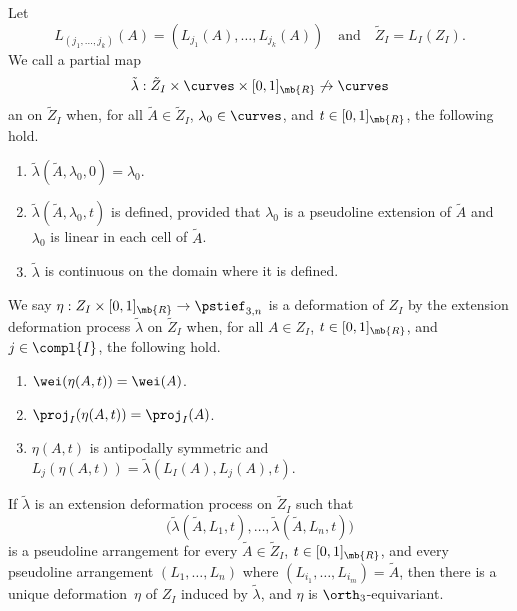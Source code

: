 Let
\[
L_{(j_1,\dots,j_k)}(A) = (L_{j_1}(A),\dots,L_{j_k}(A))
\quad \text{and} \quad
\tilde Z_I = L_I(Z_I).
\]
We call a partial map
\[ \tilde \lambda : \tilde Z_I \times \curves \times [0,1]_\mb{R} \not\to \curves \]
an  on $\tilde Z_I$ when, for all $\tilde A \in \tilde Z_I$, $\lambda_0 \in \curves$, and $t \in [0,1]_\mb{R}$, the following hold.
\begin{enumerate}
\item
$\tilde \lambda(\tilde A, \lambda_0, 0) = \lambda_0$.
\item
$\tilde \lambda(\tilde A, \lambda_0, t)$ is defined,
provided that $\lambda_0$ is a pseudoline extension of $\tilde A$ and $\lambda_0$ is linear in each cell of $\tilde A$.
\item
$\tilde \lambda$ is continuous on the domain where it is defined.
\end{enumerate}
We say $\eta: Z_I \times [0,1]_\mb{R} \to \pstief_{3,n}$ is a deformation of $Z_I$  by the extension deformation process $\tilde \lambda$ on $\tilde Z_I$ when, for all $A \in Z_I$, $t \in [0,1]_\mb{R}$, and $j \in \compl{I}$, the following hold.
\begin{enumerate}
\item
$\wei(\eta(A,t)) = \wei(A)$.
\item
$\proj_{I}(\eta(A,t)) = \proj_{I}(A)$.
\item
$\eta(A,t)$ is antipodally symmetric and $L_{j}(\eta(A,t)) = \tilde \lambda(L_I(A),L_j(A),t)$.
\end{enumerate}

\begin{claim}\label{claim-pseudoline-lift}
{If} $\tilde \lambda$ is an extension deformation process on $\tilde Z_I$ such that
\[ \bigl(\tilde \lambda(\tilde A, L_1, t),\dots,\tilde \lambda(\tilde A, L_{n}, t) \bigr) \]
is a pseudoline arrangement for every $\tilde A \in \tilde Z_I$, $t \in [0,1]_\mb{R}$, and every pseudoline arrangement $(L_1,\dots,L_n)$ where $(L_{i_1},\dots,L_{i_m}) = \tilde A$,
{then} there is a unique deformation~$\eta$ of $Z_I$ induced by $\tilde \lambda$, and $\eta$ is $\orth_3$-equivariant.
\end{claim}

